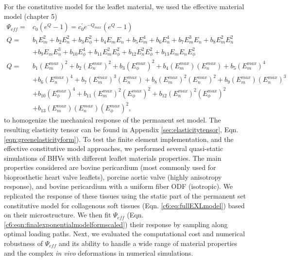     
    For the constitutive model for the leaflet material, we used the effective material model (chapter 5)
\begin{equation} \label{c6:eqn:finalexponentialmodelformscaled}
\begin{aligned}
\Psi_{eff} 	=& c_0 \left(e^{Q} - 1\right) = c_0^\prime e^{-Q_{max}}\left(e^{Q} - 1\right)    \\
Q		=& b_1 E_m^2 + b_2 E_n^2 + b_3 E_\phi^2 + b_4 E_m E_n + b_5 E_m^4 + b_6 E_n^4 + b_7 E_m^3 E_n + b_8 E_m^2 E_n^2 \\ 
&+ b_9 E_m E_n^3 + b_{10} E_\phi^4 + b_{11} E_m^2E_\phi^2 + b_{12} E_n^2 E_\phi^2 + b_{13} E_m E_n E_\phi^2 \\
Q		=& b_1 (E_m^{max})^2 + b_2 (E_n^{max})^2 + b_3 (E_\phi^{max})^2 + b_4 (E_m^{max}) (E_n^{max}) + b_5 (E_m^{max})^4   \\
    &+ b_6 (E_n^{max})^4 + b_7 (E_m^{max})^3 (E_n^{max}) + b_8 (E_m^{max})^2 (E_n^{max})^2 + b_9 (E_m^{max}) (E_n^{max})^3	\\
	&+ b_{10} (E_\phi^{max})^4 + b_{11} (E_m^{max})^2(E_\phi^{max})^2 + b_{12} (E_n^{max})^2 (E_\phi^{max})^2    \\ 
	&+ b_{13} (E_m^{max}) (E_n^{max}) (E_\phi^{max})^2,
\end{aligned}
\end{equation}
	to homogenize the mechanical response of the permanent set model. The resulting elasticity tensor can be found in Appendix \ref{sec:elasticitytensor}, Eqn. \ref{eqn:greenelasticityform}). To test the finite element implementation, and the effective constitutive model approaches, we performed several quasi-static simulations of BHVs with different leaflet materials properties. The main properties considered are bovine pericardium (most commonly used for bioprosthetic heart valve leaflets), porcine aortic valve (highly anisotropy response), and bovine pericardium with a uniform fiber ODF (isotropic). We replicated the response of these tissues using the static part of the permanent set constitutive model for collagenous soft tissues (Eqn. \ref{c6:eq:fullEXLmodel}) based on their microstructure. We then fit $\Psi_{eff}$ (Eqn. \ref{c6:eqn:finalexponentialmodelformscaled}) their response by sampling along optimal loading paths. Next, we evaluated the computational cost and numerical robustness of $\Psi_{eff}$ and its ability to handle a wide range of material properties and the complex \textit{in vivo} deformations in numerical simulations.
    

